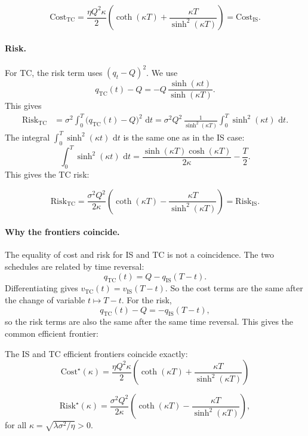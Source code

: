 \documentclass[12pt, a4paper]{article}
\newcommand{\dd}{\,\mathrm{d}}
\newcommand{\kap}{\kappa}
\begin{document}
\begin{resultbox}
\[
  \mathrm{Cost}_{\mathrm{TC}}
  = \frac{\eta Q^2 \kap}{2}
    \left(\coth(\kap T) + \frac{\kap T}{\sinh^2(\kap T)}\right)
  = \mathrm{Cost}_{\mathrm{IS}}.
\]
\end{resultbox}

\paragraph{Risk.}
For TC, the risk term uses $(q_t - Q)^2$.
We use
\[
  q_{\mathrm{TC}}(t) - Q = -Q\,\frac{\sinh(\kap t)}{\sinh(\kap T)}.
\]
This gives
\begin{align*}
  \mathrm{Risk}_{\mathrm{TC}}
  &= \sigma^2\int_0^T \bigl(q_{\mathrm{TC}}(t) - Q\bigr)^2\,\dd t
   = \sigma^2 Q^2\,\frac{1}{\sinh^2(\kap T)}\int_0^T \sinh^2(\kap t)\,\dd t.
\end{align*}
The integral $\int_0^T \sinh^2(\kap t)\,\dd t$ is the same one as in the IS case:
\[
  \int_0^T \sinh^2(\kap t)\,\dd t
  = \frac{\sinh(\kap T)\cosh(\kap T)}{2\kap} - \frac{T}{2}.
\]
This gives the TC risk:

\begin{resultbox}
\[
  \mathrm{Risk}_{\mathrm{TC}}
  = \frac{\sigma^2 Q^2}{2\kap}
    \left(\coth(\kap T) - \frac{\kap T}{\sinh^2(\kap T)}\right)
  = \mathrm{Risk}_{\mathrm{IS}}.
\]
\end{resultbox}

\paragraph{Why the frontiers coincide.}

The equality of cost and risk for IS and TC is not a coincidence.
The two schedules are related by time reversal:
\[
  q_{\mathrm{TC}}(t) = Q - q_{\mathrm{IS}}(T - t).
\]
Differentiating gives $v_{\mathrm{TC}}(t) = v_{\mathrm{IS}}(T-t)$.
So the cost terms are the same after the change of variable $t \mapsto T - t$.
For the risk,
\[
  q_{\mathrm{TC}}(t) - Q = -q_{\mathrm{IS}}(T-t),
\]
so the risk terms are also the same after the same time reversal.
This gives the common efficient frontier:

\begin{resultbox}
The IS and TC efficient frontiers coincide exactly:
\[
  \mathrm{Cost}^\star(\kap) = \frac{\eta Q^2 \kap}{2}
    \left(\coth(\kap T) + \frac{\kap T}{\sinh^2(\kap T)}\right)
    \]
  
\[
  \mathrm{Risk}^\star(\kap) = \frac{\sigma^2 Q^2}{2\kap}
    \left(\coth(\kap T) - \frac{\kap T}{\sinh^2(\kap T)}\right),
\]
for all $\kap = \sqrt{\lambda\sigma^2/\eta} > 0$.
\end{resultbox}
\end{document}
